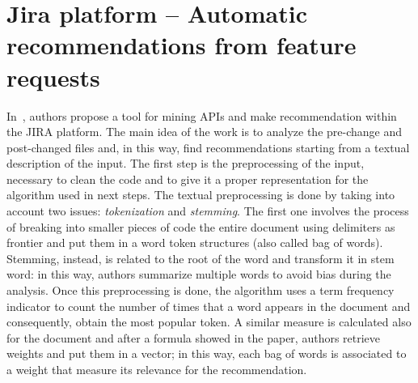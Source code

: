 
\section{Jira platform -- Automatic recommendations from feature requests}

In~\cite{thung_automatic_2013}, authors propose a tool for mining APIs and make 
recommendation within the JIRA platform. The main idea of the work is to 
analyze the pre-change and post-changed files and, in this way, find 
recommendations starting from a textual description of the input. The first 
step is the preprocessing of the input, necessary to clean the code and to give 
it a proper representation for the algorithm used in next steps. The textual 
preprocessing is done by taking into account two issues: \textit{tokenization} 
and \textit{stemming}. The first one involves the process of breaking into 
smaller pieces of code the entire document using delimiters as frontier and put 
them in a word token structures (also called bag of words). Stemming, instead, 
is related to the root of the word and transform it in stem word: in this way, 
authors summarize multiple words to avoid bias during the analysis. Once this 
preprocessing is done, the algorithm uses a term frequency indicator to count 
the number of times that a word appears in the document and consequently, 
obtain the most popular token. A similar measure is calculated also for the 
document and after a formula showed in the paper, authors retrieve weights and 
put them in a vector; in this way, each bag of words is associated to a weight 
that measure its relevance for the recommendation. 


